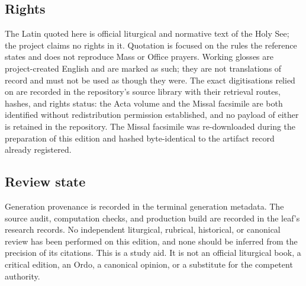 \subsection{Rights}

The Latin quoted here is official liturgical and normative text of the Holy See; the project
claims no rights in it. Quotation is focused on the rules the reference states and does not
reproduce Mass or Office prayers. Working glosses are project-created English and are marked as
such; they are not translations of record and must not be used as though they were. The exact
digitisations relied on are recorded in the repository's source library with their retrieval
routes, hashes, and rights status: the Acta volume and the Missal facsimile are both identified
without redistribution permission established, and no payload of either is retained in the
repository. The Missal facsimile was re-downloaded during the preparation of this edition and
hashed byte-identical to the artifact record already registered.

\subsection{Review state}

Generation provenance is recorded in the terminal generation metadata. The source audit,
computation checks, and production build are recorded in the leaf's research records. No
independent liturgical, rubrical, historical, or canonical review has been performed on this
edition, and none should be inferred from the precision of its citations. This is a study aid.
It is not an official liturgical book, a critical edition, an Ordo, a canonical opinion, or a
substitute for the competent authority.
